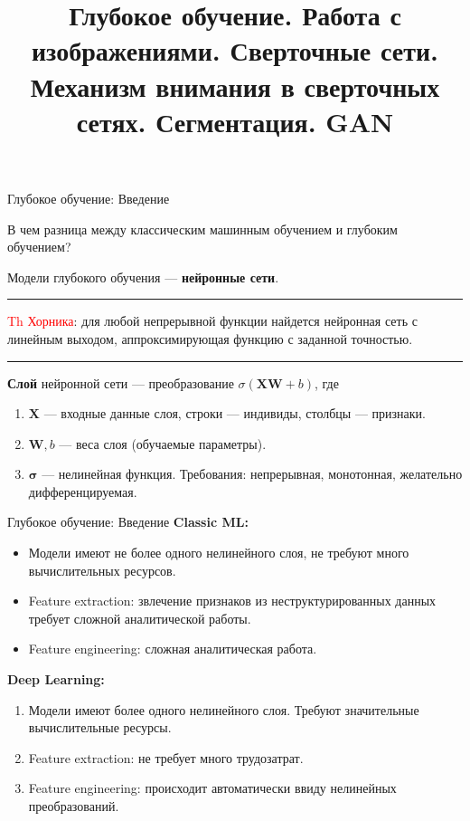 \documentclass[handout]{beamer}
\title[Статистическое и машинное обучение]{Глубокое обучение. Работа с изображениями. Сверточные сети. Механизм внимания в сверточных сетях. Сегментация. GAN}
\institute[ ]{%
	\small
	Санкт-Петербургский государственный университет\\
	Кафедра статистического моделирования
}
\date{}
\begin{document}
	
	\begin{frame}
		\titlepage
	\end{frame}

\begin{frame}{Глубокое обучение: Введение}

В чем разница между классическим машинным обучением и глубоким обучением?

\vspace*{5pt}
Модели глубокого обучения --- \textbf{нейронные сети}. 

\par\noindent\rule{\textwidth}{0.5pt}
\textcolor{red}{Th Хорника}: для любой непрерывной функции найдется нейронная сеть с линейным выходом, аппроксимирующая функцию с заданной точностью.
\par\noindent\rule{\textwidth}{0.5pt}

\vspace*{5pt}
\textbf{Слой} нейронной сети --- преобразование $\sigma(\mathbf{XW}+b)$, где

\begin{enumerate}
	\item $\mathbf{X}$ --- входные данные слоя, строки --- индивиды, столбцы --- признаки.
	\item $\mathbf{W}, b$ --- веса слоя (обучаемые параметры).
	\item $\mathbf{\sigma}$ --- нелинейная функция. Требования: непрерывная, монотонная, желательно дифференцируемая.
\end{enumerate}

\end{frame}

\begin{frame}{Глубокое обучение: Введение}
\textbf{Classic ML:}
\begin{itemize}
	\item Модели имеют не более одного нелинейного слоя, не требуют много вычислительных ресурсов.
	\item Feature extraction: звлечение признаков из неструктурированных данных требует сложной аналитической работы.
	\item Feature engineering: сложная аналитическая работа.
\end{itemize}

\textbf{Deep Learning:}
\begin{enumerate}
	\item Модели имеют более одного нелинейного слоя. Требуют значительные вычислительные ресурсы.
	\item Feature extraction: не требует много трудозатрат.
	\item Feature engineering: происходит автоматически ввиду нелинейных преобразований.
\end{enumerate}

\end{frame}
\end{document}
